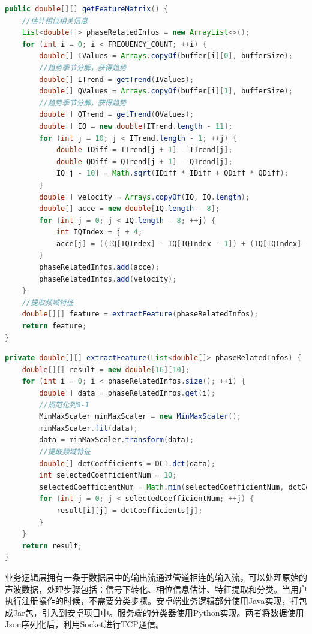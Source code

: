 \begin{lstlisting}[language={Java}, caption={相位信息估计 \label{src:phase-estimation}} ]
public double[][] getFeatureMatrix() {
    //估计相位相关信息
    List<double[]> phaseRelatedInfos = new ArrayList<>();
    for (int i = 0; i < FREQUENCY_COUNT; ++i) {
        double[] IValues = Arrays.copyOf(buffer[i][0], bufferSize);
        //趋势季节分解，获得趋势
        double[] ITrend = getTrend(IValues);   
        double[] QValues = Arrays.copyOf(buffer[i][1], bufferSize);
        //趋势季节分解，获得趋势
        double[] QTrend = getTrend(QValues);
        double[] IQ = new double[ITrend.length - 11];
        for (int j = 10; j < ITrend.length - 1; ++j) {
            double IDiff = ITrend[j + 1] - ITrend[j];
            double QDiff = QTrend[j + 1] - QTrend[j];
            IQ[j - 10] = Math.sqrt(IDiff * IDiff + QDiff * QDiff);
        }
        double[] velocity = Arrays.copyOf(IQ, IQ.length);
        double[] acce = new double[IQ.length - 8];
        for (int j = 0; j < IQ.length - 8; ++j) {
            int IQIndex = j + 4;
            acce[j] = ((IQ[IQIndex] - IQ[IQIndex - 1]) + (IQ[IQIndex] - IQ[IQIndex - 2]) / 2) / 2;
        }
        phaseRelatedInfos.add(acce);
        phaseRelatedInfos.add(velocity);
    }
    //提取频域特征
    double[][] feature = extractFeature(phaseRelatedInfos);
    return feature;
} 
\end{lstlisting}

\begin{lstlisting}[language={Java}, caption={特征提取 \label{src:feature-extraction}} ]
private double[][] extractFeature(List<double[]> phaseRelatedInfos) {
    double[][] result = new double[16][10];
    for (int i = 0; i < phaseRelatedInfos.size(); ++i) {
        double[] data = phaseRelatedInfos.get(i);
        //规范化到0-1
        MinMaxScaler minMaxScaler = new MinMaxScaler();
        minMaxScaler.fit(data);
        data = minMaxScaler.transform(data);
        //提取频域特征
        double[] dctCoefficients = DCT.dct(data);
        int selectedCoefficientNum = 10;
        selectedCoefficientNum = Math.min(selectedCoefficientNum, dctCoefficients.length);
        for (int j = 0; j < selectedCoefficientNum; ++j) {
            result[i][j] = dctCoefficients[j];
        }
    }
    return result;
}
\end{lstlisting}

业务逻辑层拥有一条于数据层中的输出流通过管道相连的输入流，可以处理原始的声波数据，处理步骤包括：信号下转化、相位信息估计、特征提取和分类。当用户执行注册操作的时候，不需要分类步骤。安卓端业务逻辑部分使用Java实现，打包成Jar包，引入到安卓项目中。服务端的分类器使用Python实现。两者将数据使用Json序列化后，利用Socket进行TCP通信。


